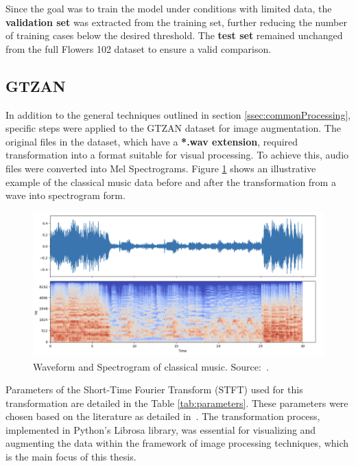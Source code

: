Since the goal was to train the model under conditions with limited data,  the \textbf{validation set} was extracted from the training set, further reducing the number of training cases below the desired threshold. The \textbf{test set} remained unchanged from the full Flowers 102 dataset to ensure a valid comparison.

\subsection{GTZAN}
\label{ssec:gtzanProcessing}

In addition to the general techniques outlined in section \ref{ssec:commonProcessing}, specific steps were applied to the GTZAN dataset for image augmentation. The original files in the dataset, which have a \textbf{*.wav extension}, required transformation into a format suitable for visual processing. To achieve this, audio files were converted into Mel Spectrograms. Figure \ref{fig:waveSpecExample} shows an illustrative example of the classical music data before and after the transformation from a wave into spectrogram form.

\begin{figure}[!htb]
    \centering
    \includegraphics[scale=0.7]{Images/wave-spec-classical.png}
    \caption{Waveform and Spectrogram of classical music. Source:~\cite{GTZAN}.}
    \label{fig:waveSpecExample}
\end{figure}

Parameters of the Short-Time Fourier Transform (STFT) used for this transformation are detailed in the Table \ref{tab:parameters}.
These parameters were chosen based on the literature as detailed in~\cite{GTZANParameters}. The transformation process, implemented in Python's Librosa library, was essential for visualizing and augmenting the data within the framework of image processing techniques, which is the main focus of this thesis.

